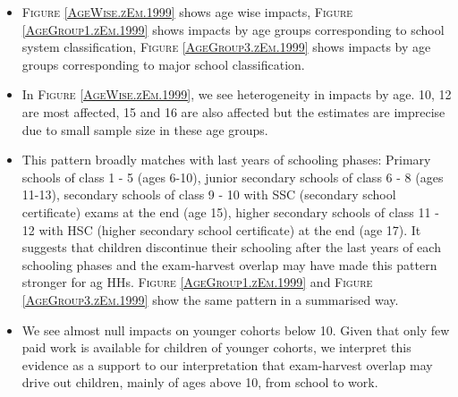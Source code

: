\begin{itemize}
\vspace{1.0ex}\setlength{\itemsep}{1.0ex}\setlength{\baselineskip}{12pt}
\item	\textsc{\footnotesize Figure \ref{AgeWise.zEm.1999}} shows age wise impacts, \textsc{\footnotesize Figure \ref{AgeGroup1.zEm.1999}} shows impacts by age groups corresponding to school system classification, \textsc{\footnotesize Figure \ref{AgeGroup3.zEm.1999}} shows impacts by age groups corresponding to major school classification. 
\item	In \textsc{\footnotesize Figure \ref{AgeWise.zEm.1999}}, we see heterogeneity in impacts by age. 10, 12 are most affected, 15 and 16 are also affected but the estimates are imprecise due to small sample size in these age groups.
\item	This pattern broadly matches with last years of schooling phases: Primary schools of class 1 - 5 (ages 6-10), junior secondary schools of class 6 - 8 (ages 11-13), secondary schools of class 9 - 10 with SSC (secondary school certificate) exams at the end (age 15), higher secondary schools of class 11 - 12 with HSC (higher secondary school certificate) at the end (age 17). It suggests that children discontinue their schooling after the last years of each schooling phases and the exam-harvest overlap may have made this pattern stronger for ag HHs. \textsc{\footnotesize Figure \ref{AgeGroup1.zEm.1999}} and \textsc{\footnotesize Figure \ref{AgeGroup3.zEm.1999}} show the same pattern in a summarised way.
\item	We see almost null impacts on younger cohorts below 10. Given that only few paid work is available for children of younger cohorts, we interpret this evidence as a support to our interpretation that exam-harvest overlap may drive out children, mainly of ages above 10, from school to work. 
\end{itemize}


